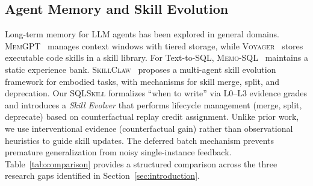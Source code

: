 \subsection{Agent Memory and Skill Evolution}
\label{subsec:memory}

Long-term memory for LLM agents has been explored in general domains. \textsc{MemGPT}~\cite{packer2023memgpt} manages context windows with tiered storage, while \textsc{Voyager}~\cite{wang2023voyager} stores executable code skills in a skill library. For Text-to-SQL, \textsc{Memo-SQL}~\cite{yang2026memosql} maintains a static experience bank.
\textsc{SkillClaw}~\cite{ma2026skillclaw} proposes a multi-agent skill evolution framework for embodied tasks, with mechanisms for skill merge, split, and deprecation. Our \textsc{SQLSkill} formalizes ``when to write'' via L0--L3 evidence grades and introduces a \emph{Skill Evolver} that performs lifecycle management (merge, split, deprecate) based on counterfactual replay credit assignment.
Unlike prior work, we use interventional evidence (counterfactual gain) rather than observational heuristics to guide skill updates. 
The deferred batch mechanism prevents premature generalization from noisy single-instance feedback. Table~\ref{tab:comparison} provides a structured comparison across the three research gaps identified in Section~\ref{sec:introduction}.


